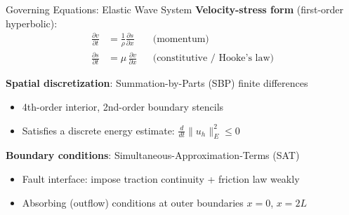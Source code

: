 \documentclass[aspectratio=169,12pt]{beamer}
\begin{document}
\begin{frame}{Governing Equations: Elastic Wave System}
  \textbf{Velocity-stress form} (first-order hyperbolic):
  \begin{align}
    \frac{\partial v}{\partial t} &= \frac{1}{\rho}\frac{\partial s}{\partial x}
    && \text{(momentum)}\\[4pt]
    \frac{\partial s}{\partial t} &= \mu\,\frac{\partial v}{\partial x}
    && \text{(constitutive / Hooke's law)}
  \end{align}

  \vspace{6pt}
  \textbf{Spatial discretization}: \alert{Summation-by-Parts (SBP)} finite differences
  \begin{itemize}
    \item 4th-order interior, 2nd-order boundary stencils
    \item Satisfies a discrete energy estimate: $\frac{d}{dt}\|u_h\|_E^2 \le 0$
  \end{itemize}

  \vspace{6pt}
  \textbf{Boundary conditions}: \alert{Simultaneous-Approximation-Terms (SAT)}
  \begin{itemize}
    \item Fault interface: impose traction continuity + friction law weakly
    \item Absorbing (outflow) conditions at outer boundaries $x=0$, $x=2L$
  \end{itemize}
\end{frame}
\end{document}
